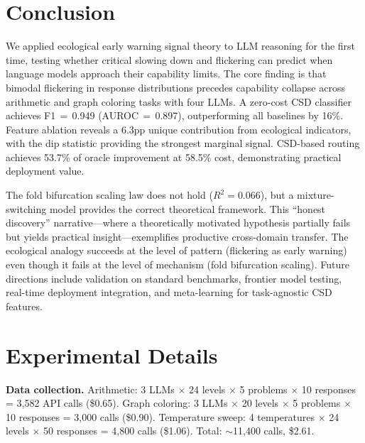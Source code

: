 \documentclass[11pt,letterpaper]{article}
\begin{document}
\section{Conclusion}
\label{sec:conclusion}

We applied ecological early warning signal theory to LLM reasoning for the first time, testing whether critical slowing down and flickering can predict when language models approach their capability limits. The core finding is that bimodal flickering in response distributions precedes capability collapse across arithmetic and graph coloring tasks with four LLMs. A zero-cost CSD classifier achieves F1$\,{=}\,$0.949 (AUROC$\,{=}\,$0.897), outperforming all baselines by 16\%. Feature ablation reveals a 6.3pp unique contribution from ecological indicators, with the dip statistic providing the strongest marginal signal. CSD-based routing achieves 53.7\% of oracle improvement at 58.5\% cost, demonstrating practical deployment value.

The fold bifurcation scaling law does not hold ($R^2{=}0.066$), but a mixture-switching model provides the correct theoretical framework. This ``honest discovery'' narrative---where a theoretically motivated hypothesis partially fails but yields practical insight---exemplifies productive cross-domain transfer. The ecological analogy succeeds at the level of pattern (flickering as early warning) even though it fails at the level of mechanism (fold bifurcation scaling). Future directions include validation on standard benchmarks, frontier model testing, real-time deployment integration, and meta-learning for task-agnostic CSD features.



\appendix
\section{Experimental Details}
\label{app:details}

\textbf{Data collection.} Arithmetic: 3 LLMs $\times$ 24 levels $\times$ 5 problems $\times$ 10 responses = 3,582 API calls (\$0.65). Graph coloring: 3 LLMs $\times$ 20 levels $\times$ 5 problems $\times$ 10 responses = 3,000 calls (\$0.90). Temperature sweep: 4 temperatures $\times$ 24 levels $\times$ 50 responses = 4,800 calls (\$1.06). Total: ${\sim}$11,400 calls, \$2.61.
\end{document}
